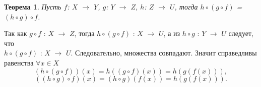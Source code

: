 \newtheorem*{t6_2_3}{Теорема}\begin{t6_2_3} Пусть $f$: $X$ $\rightarrow$ $Y$, $g$: $Y$ $\rightarrow$ $Z$, $h$: $Z$ $\rightarrow$ $U$, тогда $h \circ (g \circ f)$ = $(h \circ g) \circ f$.
\end{t6_2_3} \begin{Proof} 
	Так как $g \circ f$ : $X$ $\rightarrow$ $Z$, тогда $h \circ (g \circ f)$ : $X$ $\rightarrow$ $U$, а из
	$h \circ g$ : $Y$ $\rightarrow$ $U$ следует, что\\ $h \circ (g \circ f)$ : $X$ $\rightarrow$ $U$.
	Следовательно, множества совпадают. Значит справедливы равенства
	$\forall x \in X$ $$(h \circ (g \circ f))(x) = h((g \circ f)(x)) = h(g(f(x))),$$
	$$((h \circ g) \circ f)(x) = (h \circ g)(f(x)) = h(g(f(x))).$$
\end{Proof}





